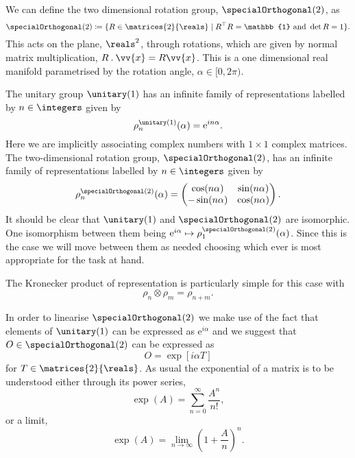 \documentclass[fleqn]{NotesClass}
\newcommand*{\action}{\mathbin{.}}
\newcommand*{\trans}{\top}
\newcommand*{\ident}{\mathbb{1}}
\newcommand*{\directproduct}{\otimes}
\newcommand*{\e}{\mathrm{e}}
\begin{document}
    We can define the two dimensional rotation group, \(\specialOrthogonal(2)\), as
    \begin{equation}
        \specialOrthogonal(2) \coloneqq \{ R \in \matrices{2}{\reals} \mid R^\trans R = \ident \text{ and } \det R = 1 \}.
    \end{equation}
    This acts on the plane, \(\reals^2\), through rotations, which are given by normal matrix multiplication, \(R \action \vv{x} = R\vv{x}\).
    This is a one dimensional real manifold parametrised by the rotation angle, \(\alpha \in [0, 2\pi)\).
    
    The unitary group \(\unitary(1)\) has an infinite family of representations labelled by \(n \in \integers\) given by
    \begin{equation}
        \rho_n^{\unitary(1)}(\alpha) = \e^{in\alpha}.
    \end{equation}
    Here we are implicitly associating complex numbers with \(1\times 1\) complex matrices.
    The two-dimensional rotation group, \(\specialOrthogonal(2)\), has an infinite family of representations labelled by \(n \in \integers\) given by
    \begin{equation}
        \rho_n^{\specialOrthogonal(2)}(\alpha) =
        \begin{pmatrix}
            \cos(n\alpha) & \sin(n\alpha)\\
            -\sin(n\alpha) & \cos(n\alpha)
        \end{pmatrix}
        .
    \end{equation}
    It should be clear that \(\unitary(1)\) and \(\specialOrthogonal(2)\) are isomorphic.
    One isomorphism between them being \(\e^{i\alpha} \mapsto \rho_{1}^{\specialOrthogonal(2)}(\alpha)\).
    Since this is the case we will move between them as needed choosing which ever is most appropriate for the task at hand.
    
    The Kronecker product of representation is particularly simple for this case with
    \begin{equation}
        \rho_{n} \directproduct \rho_{m} = \rho_{n + m}.
    \end{equation}
    
    In order to linearise \(\specialOrthogonal(2)\) we make use of the fact that elements of \(\unitary(1)\) can be expressed as \(\e^{i\alpha}\) and we suggest that \(O \in \specialOrthogonal(2)\) can be expressed as
    \begin{equation}
        O = \exp[i\alpha T]
    \end{equation}
    for \(T \in \matrices{2}{\reals}\).
    As usual the exponential of a matrix is to be understood either  through its power series,
    \begin{equation}
        \exp(A) = \sum_{n = 0}^{\infty} \frac{A^n}{n!},
    \end{equation}
    or a limit,
    \begin{equation}
        \exp(A) = \lim_{n \to \infty} \left( 1 + \frac{A}{n} \right)^{n}.
    \end{equation}
    
\end{document}
